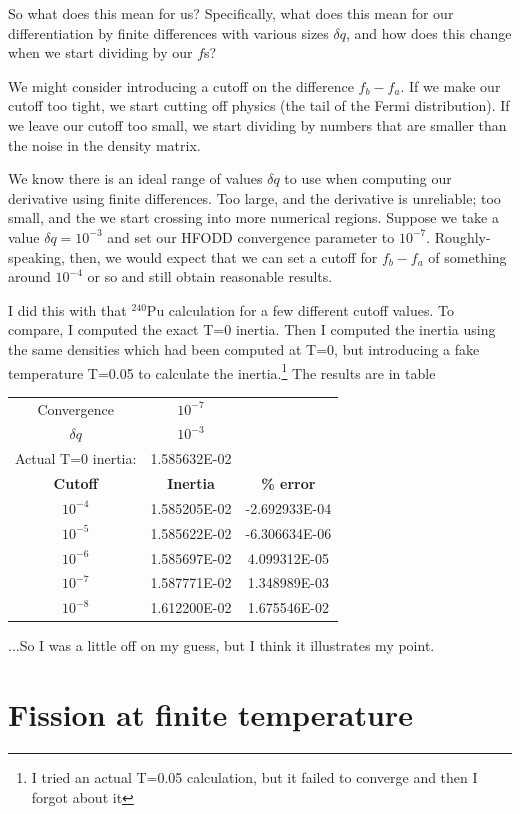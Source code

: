So what does this mean for us? Specifically, what does this mean for our differentiation by finite differences with various sizes $\delta q$, and how does this change when we start dividing by our $f$s?

We might consider introducing a cutoff on the difference $f_b-f_a$. If we make our cutoff too tight, we start cutting off physics (the tail of the Fermi distribution). If we leave our cutoff too small, we start dividing by numbers that are smaller than the noise in the density matrix.

We know there is an ideal range of values $\delta q$ to use when computing our derivative using finite differences. Too large, and the derivative is unreliable; too small, and the we start crossing into more numerical regions. Suppose we take a value $\delta q = 10^{-3}$ and set our HFODD convergence parameter to $10^{-7}$. Roughly-speaking, then, we would expect that we can set a cutoff for $f_b-f_a$ of something around $10^{-4}$ or so and still obtain reasonable results.

I did this with that $^{240}$Pu calculation for a few different cutoff values. To compare, I computed the exact T=0 inertia. Then I computed the inertia using the same densities which had been computed at T=0, but introducing a fake temperature T=0.05 to calculate the inertia.\footnote{I tried an actual T=0.05 calculation, but it failed to converge and then I forgot about it} The results are in table

\begin{tabular}{|ccc|}
\hline Convergence & $10^{-7}$ &  \\ 
$\delta q$ & $10^{-3}$ &  \\ 
Actual T=0 inertia: & 1.585632E-02 &  \\ \hline
\textbf{Cutoff} & \textbf{Inertia} & \textbf{\% error} \\ \hline
$10^{-4}$ & 1.585205E-02 & -2.692933E-04 \\
$10^{-5}$ & 1.585622E-02 & -6.306634E-06 \\
$10^{-6}$ & 1.585697E-02 & 4.099312E-05 \\
$10^{-7}$ & 1.587771E-02 & 1.348989E-03 \\
$10^{-8}$ & 1.612200E-02 & 1.675546E-02 \\ \hline
\end{tabular} 

\noindent ...So I was a little off on my guess, but I think it illustrates my point.

\section{Fission at finite temperature}

